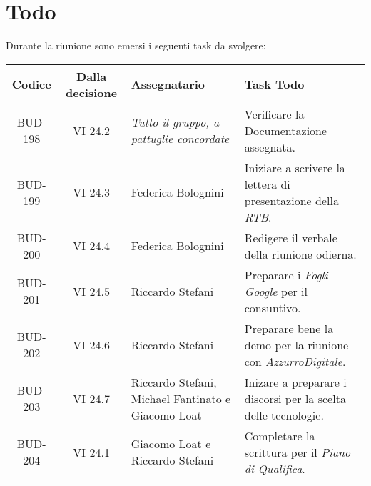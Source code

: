 
\section{Todo}

Durante la riunione sono emersi i seguenti task da svolgere:

\vspace{0.5cm}

\begin{table}[htbp]
\centering
{}
\begin{tabular}{|c|c|p{}|p{}|}
    \hline
    \rowcolor[gray]{0.75}
    \textbf{Codice} & \textbf{Dalla decisione} & \textbf{Assegnatario} & \textbf{Task Todo} \\
    \hline
    BUD-198 & VI 24.2 & \emph{Tutto il gruppo, a pattuglie concordate} & Verificare la Documentazione assegnata. \\
    \hline
    BUD-199 & VI 24.3 & Federica Bolognini & Iniziare a scrivere la lettera di presentazione della \emph{RTB}. \\
    \hline
    BUD-200 & VI 24.4 & Federica Bolognini & Redigere il verbale della riunione odierna. \\
    \hline
    BUD-201 & VI 24.5 & Riccardo Stefani & Preparare i \emph{Fogli Google} per il consuntivo. \\
    \hline
    BUD-202 & VI 24.6 & Riccardo Stefani & Preparare bene la demo per la riunione con \emph{AzzurroDigitale}. \\
    \hline
    BUD-203 & VI 24.7 & Riccardo Stefani, Michael Fantinato e Giacomo Loat & Inizare a preparare i discorsi per la scelta delle tecnologie. \\
    \hline
    BUD-204 & VI 24.1 & Giacomo Loat e Riccardo Stefani & Completare la scrittura per il \emph{Piano di Qualifica}. \\
    \hline
\end{tabular}
\end{table}